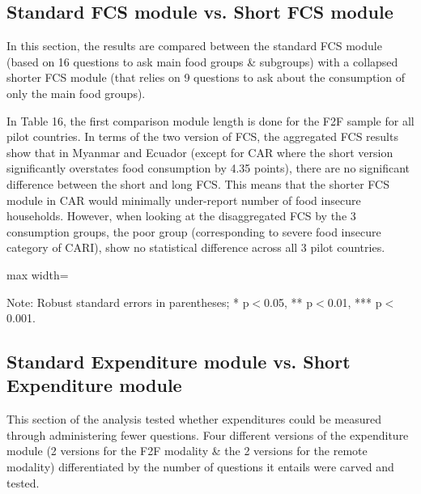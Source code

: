 \documentclass[11pt,harvard]{article}
\begin{document}
\subsection{Standard FCS module vs. Short FCS module}
	
In this section, the results are compared between the standard FCS module (based on 16 questions to ask main food groups \& subgroups) with a collapsed shorter FCS module (that relies on 9 questions to ask about the consumption of only the main food groups).
	
In Table 16, the first comparison module length is done for the F2F sample for all pilot countries. In terms of the two version of FCS, the aggregated FCS results show that in Myanmar and Ecuador (except for CAR where the short version significantly overstates food consumption by 4.35 points), there are no significant difference between the short and long FCS. This means that the shorter FCS module in CAR would minimally under-report number of food insecure households. 
However, when looking at the disaggregated FCS by the 3 consumption groups, the poor group (corresponding to severe food insecure category of CARI), show no statistical difference across all 3 pilot countries.
	
	\begin{table}[htbp]
		\centering
		\begin{adjustbox}{max width=\textwidth}
			\begin{threeparttable}
				\caption{Impact of Module Length on FCS Reporting}
				\scriptsize
				 
				\label{tab:FCS_F2F_Form_Length_All_Country}
				\begin{tablenotes}
					\item Note: Robust standard errors in parentheses; * p$<$0.05, ** p$<$0.01, *** p$<$0.001. 
				\end{tablenotes}
			\end{threeparttable}
		\end{adjustbox}
	\end{table}
	
\subsection{Standard Expenditure module vs. Short Expenditure module}
	
This section of the analysis tested whether expenditures could be measured through administering fewer questions. Four different versions of the expenditure module (2 versions for the F2F modality \& the 2 versions for the remote modality) differentiated by the number of questions it entails were carved and tested.
	
\end{document}
